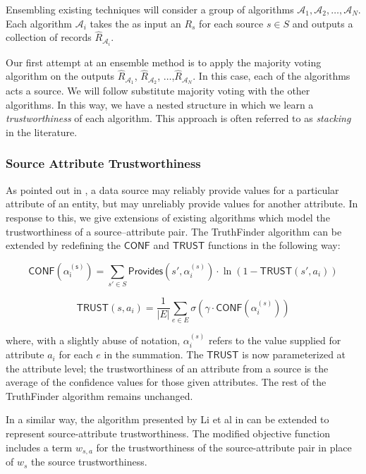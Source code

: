 \documentclass{acm_proc_article-sp}
\begin{document}
Ensembling existing techniques will consider a group of algorithms $\mathcal{A}_1,\mathcal{A}_2,\dots,\mathcal{A}_N$. Each algorithm $\mathcal{A}_i$ takes the as input an $R_s$ for each source $s \in S$ and outputs a collection of records $\hat{R}_{\mathcal{A}_i}$. 

Our first attempt at an ensemble method is to apply the majority voting algorithm on the outputs $\hat{R}_{\mathcal{A}_1}$, $\hat{R}_{\mathcal{A}_2}$, $\dots$,$\hat{R}_{\mathcal{A}_N}$. In this case, each of the algorithms acts a source. We will follow substitute majority voting with the other algorithms. In this way, we have a nested structure in which we learn a \emph{trustworthiness} of each algorithm. This approach is often referred to as \emph{stacking} in the literature. 

\subsubsection{Source Attribute Trustworthiness}

As pointed out in \cite{dong:truth}, a data source may reliably provide values for a particular attribute of an entity, but may unreliably provide values for another attribute. In response to this, we give extensions of existing algorithms which model the trustworthiness of a source--attribute pair.  The {\sc TruthFinder} algorithm can be extended by redefining the $\mathsf{CONF}$ and $\mathsf{TRUST}$ functions in the following way: 


\begin{equation}
\mathsf{CONF(\alpha_i^{(s)})} = \sum_{s' \in S} \mathsf{Provides}(s',\alpha_i^{(s)}) \cdot \ln(1-\mathsf{TRUST}(s',a_i))
\end{equation}


\begin{equation}
\mathsf{TRUST}(s,a_i) = \frac{1}{|E|} \sum_{e \in E} \sigma(\gamma \cdot \mathsf{CONF}(\alpha_i^{(s)}))
\end{equation}

where, with a slightly abuse of notation, $\alpha_i^{(s)}$ refers to the value supplied for attribute $a_i$ for each $e$ in the summation. The  $\mathsf{TRUST}$ is now parameterized at the attribute level; the trustworthiness of an attribute from a source is the average of the confidence values for those given attributes. The rest of the {\sc TruthFinder} algorithm remains unchanged. 


In a similar way, the algorithm presented by Li et al in \cite{li:resolving} can be extended to represent source-attribute trustworthiness. The modified objective function includes a term $w_{s,a}$ for the trustworthiness of the source-attribute pair in place of $w_s$ the source trustworthiness. 
\end{document}
